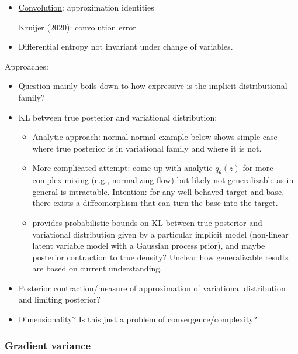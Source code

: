\documentclass[10pt]{article}
\begin{document}
\begin{itemize}
\begin{itemize}
\item
\href{https://www2.math.upenn.edu/~kazdan/508F10/convolution.pdf}{Convolution}: approximation identities

Kruijer (2020): convolution error

\item
Differential entropy not invariant under change of variables.

\end{itemize}
\end{itemize}

Approaches:
\begin{itemize}

\item
Question mainly boils down to how expressive is the implicit distributional family?

\item
KL between true posterior and variational distribution:
\begin{itemize}
\item
Analytic approach: normal-normal example below shows simple case where true posterior is in variational family and where it is not.
\item
More complicated attempt: come up with analytic $q_\theta(z)$ for more complex mixing (e.g., normalizing flow) but likely not generalizable as in general is intractable. Intention: for any well-behaved target and base, there exists a diffeomorphism that can turn the base into the target.
\item
\citet{Plummer:2021} provides probabilistic bounds on KL between true posterior and variational distribution given by a particular implicit model (non-linear latent variable model with a Gaussian process prior), and maybe posterior contraction to true density? Unclear how generalizable results are based on current understanding.
\end{itemize}

\item
Posterior contraction/measure of approximation of variational distribution and limiting posterior?

\item
Dimensionality? Is this just a problem of convergence/complexity?

\end{itemize}


\subsubsection{Gradient variance}
\end{document}
